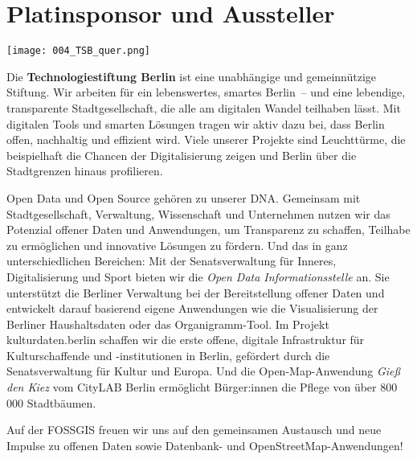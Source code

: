 \section*{Platinsponsor und Aussteller}
\begin{center}
  \texttt{[image: 004\_TSB\_quer.png]}
\end{center}
\noindent
Die {\bfseries Technologiestiftung Berlin} ist eine unabhängige und gemeinnützige Stiftung. Wir arbeiten für ein lebenswertes, smartes Berlin~-- und eine lebendige, transparente Stadtgesellschaft, die alle am digitalen Wandel teilhaben lässt. Mit digitalen Tools und smarten Lösungen tragen wir aktiv dazu bei, dass Berlin offen, nachhaltig und effizient wird. Viele unserer Projekte sind Leuchttürme, die beispielhaft die Chancen der Digitalisierung zeigen und Berlin über die Stadtgrenzen hinaus profilieren.

\noindent
Open Data und Open Source gehören zu unserer DNA. Gemeinsam mit Stadtgesellschaft, Verwaltung, Wissenschaft und Unternehmen nutzen wir das Potenzial offener Daten und Anwendungen, um Transparenz zu schaffen, Teilhabe zu ermöglichen und innovative Lösungen zu fördern. Und das in ganz unterschiedlichen Bereichen: Mit der Senatsverwaltung für Inneres, Digitalisierung und Sport bieten wir die \emph{Open Data Informationsstelle} an. Sie unterstützt die Berliner Verwaltung bei der Bereitstellung offener Daten und entwickelt darauf basierend eigene Anwendungen wie die Visualisierung der Berliner Haushaltsdaten oder das Organigramm-Tool. Im Projekt kulturdaten.berlin schaffen wir die erste offene, digitale Infrastruktur für Kulturschaffende und -institutionen in Berlin, gefördert durch die Senatsverwaltung für Kultur und Europa. Und die Open-Map-Anwendung \emph{Gieß den Kiez} vom CityLAB Berlin ermöglicht Bürger:innen die Pflege von über 800\,000 Stadtbäumen.

\noindent
Auf der FOSSGIS freuen wir uns auf den gemeinsamen Austausch und neue Impulse zu offenen Daten sowie Datenbank- und OpenStreetMap-Anwendungen!

